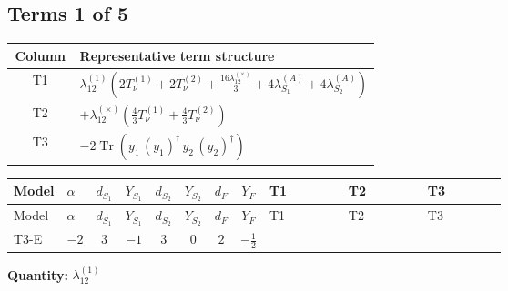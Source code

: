 \documentclass[8pt]{article}
\begin{document}
\begin{landscape}
\subsection*{Terms 1 of 5}
\begin{center}
\begin{tabular}{@{}c >{\raggedright\arraybackslash}p{0.82\linewidth}@{}}
\toprule
Column & Representative term structure \\
\midrule
T1 & \(\displaystyle {\lambda_{12}^{(1)}} \left(2 T_{\nu}^{(1)}+2 T_{\nu}^{(2)}+\frac{16 {\lambda_{12}^{(\times)}}}{3}+4 {\lambda_{S_1}^{(A)}}+4 {\lambda_{S_2}^{(A)}}\right)\) \\
\midrule
T2 & \(\displaystyle +{\lambda_{12}^{(\times)}} \left(\frac{4}{3} T_{\nu}^{(1)}+\frac{4}{3} T_{\nu}^{(2)}\right)\) \\
\midrule
T3 & \(\displaystyle -2 \operatorname{Tr}\!\left({y_1}\,\left({y_1}\right)^{\dagger}\,{y_2}\,\left({y_2}\right)^{\dagger}\right)\) \\
\midrule
\bottomrule
\end{tabular}
\end{center}
\smallskip
\tiny
\begin{longtable}{@{}llcccccc >{\raggedright\arraybackslash}p{0.21\linewidth} >{\raggedright\arraybackslash}p{0.21\linewidth} >{\raggedright\arraybackslash}p{0.21\linewidth}@{}}
\toprule
Model & $\alpha$ & $d_{S_1}$ & $Y_{S_1}$ & $d_{S_2}$ & $Y_{S_2}$ & $d_F$ & $Y_F$ & T1 & T2 & T3 \\
\midrule
\endfirsthead
\toprule
Model & $\alpha$ & $d_{S_1}$ & $Y_{S_1}$ & $d_{S_2}$ & $Y_{S_2}$ & $d_F$ & $Y_F$ & T1 & T2 & T3 \\
\midrule
\endhead
T3-E & $-2$ & $3$ & $-1$ & $3$ & $0$ & $2$ & $-\frac{1}{2}$ & \scriptsize\adjustbox{max width=\linewidth}{$\begin{gathered} {\lambda_{12}^{(1)}} \left(2 T_{\nu}^{(1)}+2 T_{\nu}^{(2)}+\frac{16 {\lambda_{12}^{(\times)}}}{3}+4 {\lambda_{S_1}^{(A)}}+4 {\lambda_{S_2}^{(A)}}\right)\end{gathered}$} & \scriptsize\adjustbox{max width=\linewidth}{$\begin{gathered} +{\lambda_{12}^{(\times)}} \left(\frac{4}{3} T_{\nu}^{(1)}+\frac{4}{3} T_{\nu}^{(2)}\right)\end{gathered}$} & \scriptsize\adjustbox{max width=\linewidth}{$\begin{gathered} -2 \operatorname{Tr}\!\left({y_1}\,\left({y_1}\right)^{\dagger}\,{y_2}\,\left({y_2}\right)^{\dagger}\right)\end{gathered}$} \\
\midrule
\bottomrule
\end{longtable}
\clearpage
\noindent\textbf{Quantity: }$\lambda_{12}^{(1)}$\par\smallskip

\end{landscape}
\end{document}
